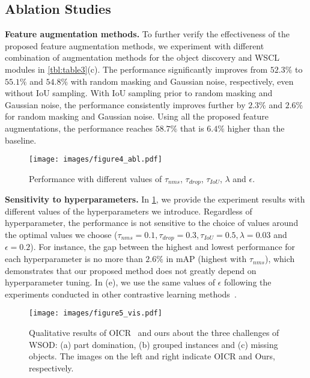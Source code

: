 \documentclass[runningheads]{llncs}
\begin{document}
\subsection{Ablation Studies}
\noindent\textbf{Feature augmentation methods.}
To further verify the effectiveness of the proposed feature augmentation methods, we experiment with different combination of augmentation methods for the object discovery and WSCL modules in \cref{tbl:table3}(c).
The performance significantly improves from $52.3\%$ to $55.1\%$ and $54.8\%$ with random masking and Gaussian noise, respectively, even without IoU sampling.
With IoU sampling prior to random masking and Gaussian noise, the performance consistently improves further by $2.3\%$ and $2.6\%$ for random masking and Gaussian noise.
Using all the proposed feature augmentations, the performance reaches $58.7\%$ that is $6.4\%$ higher than the baseline.

\begin{figure}[t!]
\centering
\texttt{[image: images/figure4\_abl.pdf]}
\caption{Performance with different values of $\tau_{nms}$, $\tau_{drop}$, $\tau_{IoU}$, $\lambda$ and $\epsilon$.}
\label{fig:abl_study}
\end{figure}




\noindent\textbf{Sensitivity to hyperparameters.}
In \cref{fig:abl_study}, we provide the experiment results with different values of the hyperparameters we introduce.
Regardless of hyperparameter, the performance is not sensitive to the choice of values around the optimal values we choose ($\tau_{nms}=0.1, \tau_{drop}=0.3, \tau_{IoU}=0.5, \lambda=0.03$ and $\epsilon=0.2$).  
For instance, the gap between the highest and lowest performance for each hyperparameter is no more than $2.6\%$ in mAP (highest with $\tau_{nms}$), which demonstrates that our proposed method does not greatly depend on hyperparameter tuning.
In (e), we use the same values of $\epsilon$ following the experiments conducted in other contrastive learning methods~\cite{khosla2020supervised,chen2020simple}.


\begin{figure*}[t!]
\centering
\texttt{[image: images/figure5\_vis.pdf]}
\caption{Qualitative results of OICR~\cite{Tang_2017_CVPR} and ours about the three challenges of WSOD: (a) part domination, (b) grouped instances and (c) missing objects. 
The images on the left and right  indicate OICR and Ours, respectively.}
\label{fig:visualization}
\end{figure*}
\end{document}
